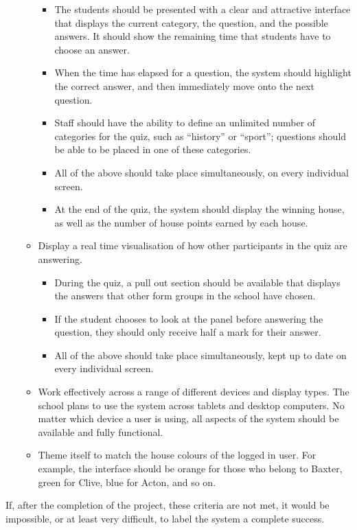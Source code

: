 \begin{itemize}
\begin{itemize}
\begin{itemize}
			\item The students should be presented with a clear and attractive interface that displays the current category, the question, and the possible answers. It should show the remaining time that students have to choose an answer.

			\item When the time has elapsed for a question, the system should highlight the correct answer, and then immediately move onto the next question.

			\item Staff should have the ability to define an unlimited number of categories for the quiz, such as ``history'' or ``sport''; questions should be able to be placed in one of these categories.

			\item All of the above should take place simultaneously, on every individual screen.

			\item At the end of the quiz, the system should display the winning house, as well as the number of house points earned by each house.
		\end{itemize}

	\item Display a real time visualisation of how other participants in the quiz are answering.

		\begin{itemize}
			\item During the quiz, a pull out section should be available that displays the answers that other form groups in the school have chosen.

			\item If the student chooses to look at the panel before answering the question, they should only receive half a mark for their answer.

			\item All of the above should take place simultaneously, kept up to date on every individual screen.
		\end{itemize}

	\item Work effectively across a range of different devices and display types. The school plans to use the system across tablets and desktop computers. No matter which device a user is using, all aspects of the system should be available and fully functional.

	\item Theme itself to match the house colours of the logged in user. For example, the interface should be orange for those who belong to Baxter, green for Clive, blue for Acton, and so on.
\end{itemize}

\end{itemize}

If, after the completion of the project, these criteria are not met, it would be impossible, or at least very difficult, to label the system a complete success.
